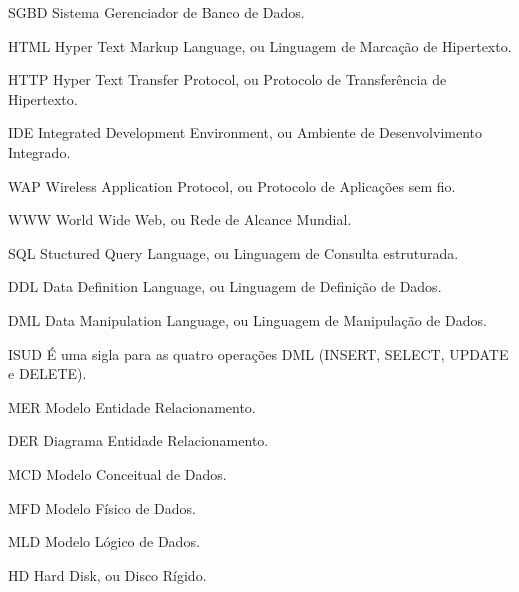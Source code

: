 \begin{siglas}
	\item[SGBD] Sistema Gerenciador de Banco de Dados.
	\item[HTML] Hyper Text Markup Language, ou Linguagem de Marcação de Hipertexto.
	\item[HTTP] Hyper Text Transfer Protocol, ou Protocolo de Transferência de Hipertexto.
	\item[IDE]	Integrated Development Environment, ou Ambiente de Desenvolvimento Integrado.
	\item[WAP]	Wireless Application Protocol, ou Protocolo de Aplicações sem fio.
	\item[WWW]	World Wide Web, ou Rede de Alcance Mundial.
	\item[SQL]	Stuctured Query Language, ou Linguagem de Consulta estruturada.
	\item[DDL]	Data Definition Language, ou Linguagem de Definição de Dados.
	\item[DML]	Data Manipulation Language, ou Linguagem de Manipulação de Dados.
	\item[ISUD]	É uma sigla para as quatro operações DML (INSERT, SELECT, UPDATE e DELETE).
	\item[MER]	Modelo Entidade Relacionamento. 
	\item[DER]	Diagrama Entidade Relacionamento.
	\item[MCD]	Modelo Conceitual de Dados. 
	\item[MFD]	Modelo Físico de Dados. 
	\item[MLD]	Modelo Lógico de Dados. 
	\item[HD]	Hard Disk, ou Disco Rígido. 

	
\end{siglas}